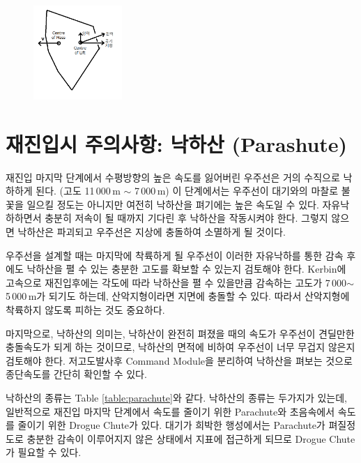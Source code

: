 \documentclass[9pt]{amsbook}
\begin{document}
\begin{figure}
\caption{}
\includegraphics[width=0.3\textwidth]{lift.png}
\end{figure}

\section{재진입시 주의사항: 낙하산 (Parashute)}
재진입 마지막 단계에서 수평방향의 높은 속도를 잃어버린 우주선은 거의 수직으로 낙하하게 된다. (고도 11\,000\,m $\sim$ 7\,000\,m) 이 단계에서는 우주선이 대기와의 마찰로 불꽃을 일으킬 정도는 아니지만 여전히 낙하산을 펴기에는 높은 속도일 수 있다. 자유낙하하면서 충분히 저속이 될 때까지 기다린 후 낙하산을 작동시켜야 한다. 그렇지 않으면 낙하산은 파괴되고 우주선은 지상에 충돌하여 소멸하게 될 것이다.

우주선을 설계할 때는 마지막에 착륙하게 될 우주선이 이러한 자유낙하를 통한 감속 후에도 낙하산을 펼 수 있는 충분한 고도를 확보할 수 있는지 검토해야 한다. Kerbin에 고속으로 재진입후에는 각도에 따라 낙하산을 펼 수 있을만큼 감속하는 고도가 7\,000$\sim$5\,000\,m가 되기도 하는데, 산악지형이라면 지면에 충돌할 수 있다. 따라서 산악지형에 착륙하지 않도록 피하는 것도 중요하다.

마지막으로, 낙하산의 의미는, 낙하산이 완전히 펴졌을 때의 속도가 우주선이 견딜만한 충돌속도가 되게 하는 것이므로, 낙하산의 면적에 비하여 우주선이 너무 무겁지 않은지 검토해야 한다. 저고도발사후 Command Module을 분리하여 낙하산을 펴보는 것으로 종단속도를 간단히 확인할 수 있다.

낙하산의 종류는 Table \ref{table:parachute}와 같다. 낙하산의 종류는 두가지가 있는데, 일반적으로 재진입 마지막 단계에서 속도를 줄이기 위한 Parachute와 초음속에서 속도를 줄이기 위한 Drogue Chute가 있다. 대기가 희박한 행성에서는 Parachute가 펴질정도로 충분한 감속이 이루어지지 않은 상태에서 지표에 접근하게 되므로 Drogue Chute가 필요할 수 있다.
\end{document}
